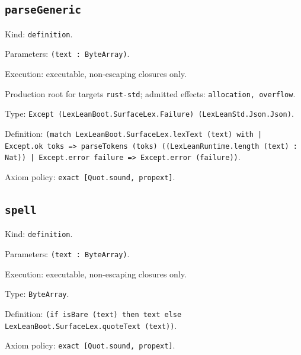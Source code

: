 \documentclass[11pt]{article}
\begin{document}
\subsection*{\texttt{parseGeneric}}
\noindent Kind: \texttt{definition}.\par
\noindent Parameters: \texttt{(text : ByteArray)}.\par
\noindent Execution: executable, non-escaping closures only.\par
\noindent Production root for targets \texttt{rust-std}; admitted effects: \texttt{allocation, overflow}.\par
\noindent Type: \texttt{Except (LexLeanBoot.SurfaceLex.Failure) (LexLeanStd.Json.Json)}.\par
\noindent Definition: \texttt{(match LexLeanBoot.SurfaceLex.lexText (text) with | Except.ok toks => parseTokens (toks) ((LexLeanRuntime.length (text) : Nat)) | Except.error failure => Except.error (failure))}.\par
\noindent Axiom policy: \texttt{exact [Quot.sound, propext]}.\par
\subsection*{\texttt{spell}}
\noindent Kind: \texttt{definition}.\par
\noindent Parameters: \texttt{(text : ByteArray)}.\par
\noindent Execution: executable, non-escaping closures only.\par
\noindent Type: \texttt{ByteArray}.\par
\noindent Definition: \texttt{(if isBare (text) then text else LexLeanBoot.SurfaceLex.quoteText (text))}.\par
\noindent Axiom policy: \texttt{exact [Quot.sound, propext]}.\par
\end{document}
